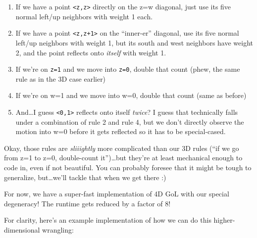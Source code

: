 \documentclass[]{article}
\begin{document}
\begin{enumerate}
\def\labelenumi{\arabic{enumi}.}
\tightlist
\item
  If we have a point \texttt{\textless{}z,z\textgreater{}} directly on the z=w
  diagonal, just use its five normal left/up neighbors with weight 1 each.
\item
  If we have a point \texttt{\textless{}z,z+1\textgreater{}} on the ``inner-er''
  diagonal, use its five normal left/up neighbors with weight 1, but its south
  and west neighbors have weight 2, and the point reflects onto \emph{itself}
  with weight 1.
\item
  If we're on \texttt{z=1} and we move into \texttt{z=0}, double that count
  (phew, the same rule as in the 3D case earlier)
\item
  If we're on w=1 and we move into w=0, double that count (same as before)
\item
  And\ldots I guess \texttt{\textless{}0,1\textgreater{}} reflects onto itself
  \emph{twice}? I guess that technically falls under a combination of rule 2 and
  rule 4, but we don't directly observe the motion into w=0 before it gets
  reflected so it has to be special-cased.
\end{enumerate}

Okay, those rules are \emph{sliiightly} more complicated than our 3D rules (``if
we go from z=1 to z=0, double-count it'')\ldots but they're at least mechanical
enough to code in, even if not beautiful. You can probably foresee that it might
be tough to generalize, but\ldots we'll tackle that when we get there :)

For now, we have a super-fast implementation of 4D GoL with our special
degeneracy! The runtime gets reduced by a factor of 8!

For clarity, here's an example implementation of how we can do this
higher-dimensional wrangling:
\end{document}

